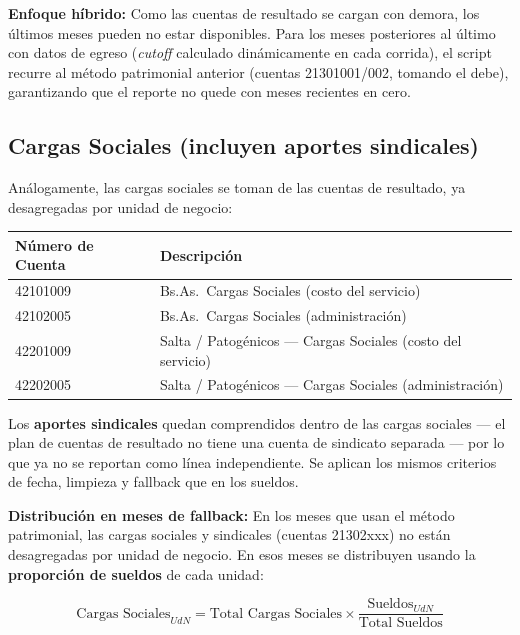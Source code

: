\documentclass[12pt, a4paper]{article}
\begin{document}
\textbf{Enfoque híbrido:} Como las cuentas de resultado se cargan con demora, los últimos meses pueden no estar disponibles. Para los meses posteriores al último con datos de egreso (\emph{cutoff} calculado dinámicamente en cada corrida), el script recurre al método patrimonial anterior (cuentas 21301001/002, tomando el debe), garantizando que el reporte no quede con meses recientes en cero.

\subsection{Cargas Sociales (incluyen aportes sindicales)}

Análogamente, las cargas sociales se toman de las cuentas de resultado, ya desagregadas por unidad de negocio:

\vspace{0.5em}
\begin{center}
\begin{tabular}{ll}
\toprule
\rowcolor{azulclaro}
\textbf{Número de Cuenta} & \textbf{Descripción} \\
\midrule
42101009 & Bs.As.\ Cargas Sociales (costo del servicio) \\
\rowcolor{grisclaro}
42102005 & Bs.As.\ Cargas Sociales (administración) \\
42201009 & Salta / Patogénicos --- Cargas Sociales (costo del servicio) \\
\rowcolor{grisclaro}
42202005 & Salta / Patogénicos --- Cargas Sociales (administración) \\
\bottomrule
\end{tabular}
\end{center}
\vspace{0.5em}

Los \textbf{aportes sindicales} quedan comprendidos dentro de las cargas sociales --- el plan de cuentas de resultado no tiene una cuenta de sindicato separada --- por lo que ya no se reportan como línea independiente. Se aplican los mismos criterios de fecha, limpieza y fallback que en los sueldos.

\textbf{Distribución en meses de fallback:} En los meses que usan el método patrimonial, las cargas sociales y sindicales (cuentas 21302xxx) no están desagregadas por unidad de negocio. En esos meses se distribuyen usando la \textbf{proporción de sueldos} de cada unidad:

\[
\text{Cargas Sociales}_{UdN} = \text{Total Cargas Sociales} \times \frac{\text{Sueldos}_{UdN}}{\text{Total Sueldos}}
\]
\end{document}
